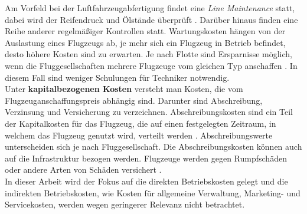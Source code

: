 Am Vorfeld bei der Luftfahrzeugabfertigung findet eine \textit{Line Maintenance} statt, 
dabei wird der Reifendruck und Ölstände überprüft \cite{conrady2019luftverkehr}. 
Darüber hinaus finden eine Reihe anderer regelmäßiger Kontrollen statt.
Wartungskosten hängen von der Auslastung eines Flugzeugs ab, 
je mehr sich ein Flugzeug in Betrieb befindet, 
desto höhere Kosten sind zu erwarten. 
%
%
Je nach Flotte sind Ersparnisse möglich, wenn die Fluggesellschaften mehrere Flugzeuge vom gleichen Typ anschaffen \cite{conrady2019luftverkehr}. 
In diesem Fall sind weniger Schulungen für Techniker notwendig.\\
%
%
%
%
%
Unter \textbf{kapitalbezogenen Kosten} versteht man Kosten, die vom Flugzeuganschaffungspreis abhängig sind.
Darunter sind Abschreibung, Verzinsung und Versicherung zu verzeichnen.
Abschreibungskosten sind ein Teil der Kapitalkosten für das Flugzeug, 
die auf einen festgelegten Zeitraum, in welchem das Flugzeug genutzt wird, 
verteilt werden \cite{conrady2019luftverkehr}.
Abschreibungswerte unterscheiden sich je nach Fluggesellschaft.
Die Abschreibungskosten können auch auf die Infrastruktur bezogen werden. 
Flugzeuge werden gegen Rumpfschäden oder andere Arten von Schäden versichert \cite{scholz_design_evaluation_doc}.  \\
%
%
%
In dieser Arbeit wird der Fokus auf die direkten Betriebskosten gelegt und die indirekten Betriebskosten, wie Kosten für 
allgemeine Verwaltung, Marketing- und Servicekosten, werden wegen geringerer Relevanz nicht betrachtet.\\
%
